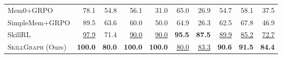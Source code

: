 \begin{table}[t]
\begin{tabular}{lrrrrrrr|rr}
    Mem0+GRPO       & 78.1 & 54.8 & 56.1 & 31.0 & 65.0 & 26.9 & 54.7 & 58.1 & 37.5 \\
    SimpleMem+GRPO  & 89.5 & 63.6 & 60.0 & 50.0 & 64.9 & 26.3 & 62.5 & 67.8 & 46.9 \\
    SkillRL         & \underline{97.9} & 71.4 & \underline{90.0} & \underline{90.0} & \textbf{95.5} & \textbf{87.5} & \underline{89.9} & \underline{85.2} & \underline{72.7} \\
    \midrule
    \textsc{SkillGraph} (Ours) & \textbf{100.0} & \textbf{80.0} & \textbf{100.0} & \textbf{100.0} & \underline{80.0} & \underline{83.3} & \textbf{90.6} & \textbf{91.5} & \textbf{84.4} \\
    \bottomrule
    \end{tabular}
    \end{table}
    